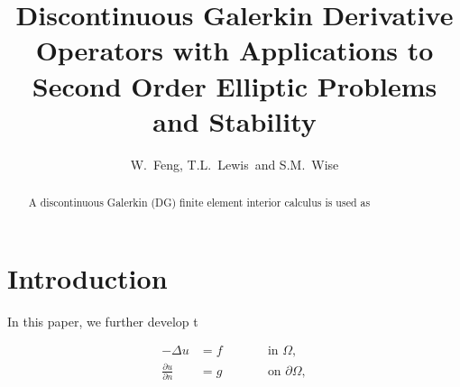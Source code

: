 \documentclass[cmbright]{mymmaauth}
\newcommand{\Ome}{\Omega}
\newcommand{\p}{\partial}
\newcommand{\Del}{\Delta}
\begin{document}


	\title{Discontinuous Galerkin Derivative Operators with Applications to 
Second Order Elliptic Problems and Stability}

\author{W.~Feng, T.L.~Lewis\corrauth\ and S.M.~Wise}

\address{Mathematics Department, The University of Tennessee, Knoxville, TN, 37996
	\\
Department of Mathematics and Statistics, 
The University of North Carolina at Greensboro, Greensboro, NC, 27402}


\begin{abstract}
A discontinuous Galerkin (DG) finite element interior calculus is used as 
\end{abstract}

	

	\maketitle

	\vspace{-6pt}

	\section{Introduction}
	\label{intro-section}

In this paper, we further develop t


	\begin{subequations} 
	\label{problem_neumann}
	\label{PDE}
	\begin{alignat}{2}
-\Del u & =f \qquad &&\text{in }\Ome,
	\\
\frac{\partial u}{\partial n} & =g\qquad &&\text{on }\p\Ome, 
	\end{alignat}
	\end{subequations}
\end{document}
